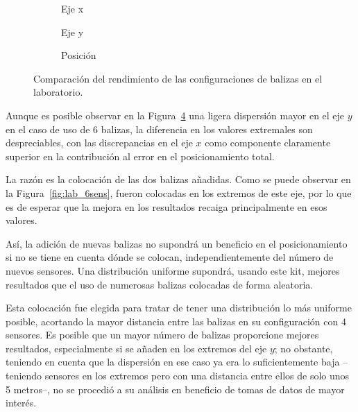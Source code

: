 \begin{figure}[H]
  \centering
    \begin{subfigure}[b]{.3\textwidth}
      \centering
      \hspace*{-0.8cm}
       
      \vspace*{-0.5cm}
      \caption{Eje x}
      \label{fig:boxplot_lab_x}
    \end{subfigure}
    \hspace*{0.1cm}
    \begin{subfigure}[b]{.3\textwidth}
      \centering
        
      \vspace*{-0.5cm}
      \caption{Eje y}
      \label{fig:boxplot_lab_y}
    \end{subfigure}
    \begin{subfigure}[b]{.3\textwidth}
        \centering
          
        \caption{Posición}
        \label{fig:boxplot_lab_pos}
      \end{subfigure}
    \caption{Comparación del rendimiento de las configuraciones de balizas en el laboratorio.}
    \label{fig:boxplot_lab}
\end{figure}

Aunque es posible observar en la Figura~\ref{fig:boxplot_lab} una ligera dispersión mayor en el eje $y$ en el caso de uso de 6 balizas, la diferencia en los valores extremales son despreciables, con las discrepancias en el eje $x$ como componente claramente superior en la contribución al error en el posicionamiento total.

La razón es la colocación de las dos balizas añadidas.
Como se puede observar en la Figura~\ref{fig:lab_6sens}, fueron colocadas en los extremos de este eje, por lo que es de esperar que la mejora en los resultados recaiga principalmente en esos valores.

Así, la adición de nuevas balizas no supondrá un beneficio en el posicionamiento si no se tiene en cuenta dónde se colocan, independientemente del número de nuevos sensores.
Una distribución uniforme supondrá, usando este kit, mejores resultados que el uso de numerosas balizas colocadas de forma aleatoria.

Esta colocación fue elegida para tratar de tener una distribución lo más uniforme posible, acortando la mayor distancia entre las balizas en su configuración con 4 sensores.
Es posible que un mayor número de balizas proporcione mejores resultados, especialmente si se añaden en los extremos del eje $y$; no obstante, teniendo en cuenta que la dispersión en ese caso ya era lo suficientemente baja --teniendo sensores en los extremos pero con una distancia entre ellos de solo unos 5 metros--, no se procedió a su análisis en beneficio de tomas de datos de mayor interés.

